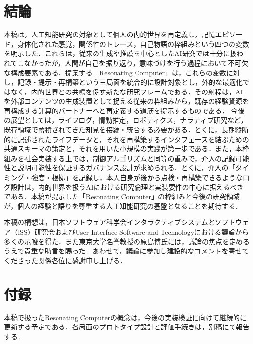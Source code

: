 \documentclass[originalpaper]{jsaiart}
\begin{document}
\section{結論}
本稿は，人工知能研究の対象として個人の内的世界を再定義し，記憶エピソード，身体化された感覚，関係性のトレース，自己物語の枠組みという四つの変数を明示した．これらは，従来の生成や推薦を中心としたAI研究では十分に扱われてこなかったが，人間が自己を振り返り，意味づけを行う過程において不可欠な構成要素である．提案する「Resonating Computer」は，これらの変数に対し，記録・提示・再構築という三局面を統合的に設計対象とし，外的な最適化ではなく，内的世界との共鳴を促す新たな研究フレームである．その射程は，AIを外部コンテンツの生成装置として捉える従来の枠組みから，既存の経験資源を再構成する計算的パートナーへと再定義する道筋を提示するものである．
今後の展望としては，ライフログ，情動推定，ロボティクス，ナラティブ研究など，既存領域で蓄積されてきた知見を接続・統合する必要がある．とくに，長期縦断的に記述されたライフデータと，それを再構築するインタフェースを結ぶための共通スキーマの策定と，それを用いた小規模の実践が第一歩である．また，本枠組みを社会実装する上では，制御アルゴリズムと同等の重みで，介入の記録可能性と説明可能性を保証するガバナンス設計が求められる．とくに，介入の「タイミング・強度・根拠」を記録し，本人自身が後から点検・再構築できるようなログ設計は，内的世界を扱うAIにおける研究倫理と実装要件の中心に据えるべきである．本稿が提示した「Resonating Computer」の枠組みと今後の研究領域が，個人の経験と語りを尊重する人工知能研究の基盤となることを期待する．

\begin{acknowledgment}
本稿の構想は，日本ソフトウェア科学会インタラクティブシステムとソフトウェア（ISS）研究会およびUser Interface Software and Technologyにおける議論から多くの示唆を得た．また東京大学名誉教授の原島博氏には，議論の焦点を定めるうえで貴重な助言を賜った．あわせて，議論に参加し建設的なコメントを寄せてくださった関係各位に感謝申し上げる．
\end{acknowledgment}




\appendix

\section{付録}
本稿で扱ったResonating Computerの概念は，今後の実装検証に向けて継続的に更新する予定である．各局面のプロトタイプ設計と評価手続きは，別稿にて報告する．

\begin{biography}
\end{biography}
\end{document}
